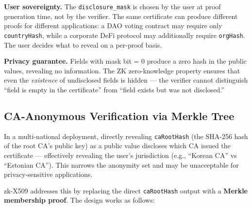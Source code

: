 \documentclass[11pt, a4paper]{article}
\begin{document}
\textbf{User sovereignty.} The \texttt{disclosure\_mask} is chosen by
the user at proof generation time, not by the verifier. The same
certificate can produce different proofs for different applications: a
DAO voting contract may require only \texttt{countryHash}, while a
corporate DeFi protocol may additionally require \texttt{orgHash}. The
user decides what to reveal on a per-proof basis.

\textbf{Privacy guarantee.} Fields with mask bit = 0 produce a zero hash
in the public values, revealing no information. The ZK zero-knowledge
property ensures that even the \emph{existence} of undisclosed fields is
hidden --- the verifier cannot distinguish ``field is empty in the
certificate'' from ``field exists but was not disclosed.''

\subsection{CA-Anonymous Verification via Merkle
Tree}\label{ca-anonymous-verification-via-merkle-tree}

In a multi-national deployment, directly revealing \texttt{caRootHash}
(the SHA-256 hash of the root CA's public key) as a public value
discloses which CA issued the certificate --- effectively revealing the
user's jurisdiction (e.g., ``Korean CA'' vs ``Estonian CA''). This
narrows the anonymity set and may be unacceptable for privacy-sensitive
applications.

zk-X509 addresses this by replacing the direct \texttt{caRootHash}
output with a \textbf{Merkle membership proof}. The design works as
follows:
\end{document}
